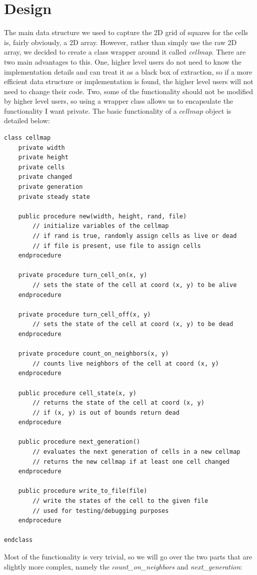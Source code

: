 \documentclass[12pt]{report}
\begin{document}
\chapter{Design}
The main data structure we used to capture the 2D grid of squares for the cells is, fairly obviously, a 2D array.
However, rather than simply use the raw 2D array, we decided to create a class wrapper around it called \emph{cellmap}.
There are two main advantages to this. One, higher level users do not need to know the implementation details and can treat
it as a black box of extraction, so if a more efficient data structure or implementation is found, 
the higher level users will not need to change their code.
Two, some of the functionality should not be modified by higher level users, so using a wrapper class allows us to encapsulate the functionality I want private.
The basic functionality of a $cellmap$ object is detailed below:
\begin{verbatim}
class cellmap
    private width
    private height
    private cells
    private changed
    private generation
    private steady state

    public procedure new(width, height, rand, file)
        // initialize variables of the cellmap 
        // if rand is true, randomly assign cells as live or dead
        // if file is present, use file to assign cells
    endprocedure

    private procedure turn_cell_on(x, y)
        // sets the state of the cell at coord (x, y) to be alive
    endprocedure

    private procedure turn_cell_off(x, y)
        // sets the state of the cell at coord (x, y) to be dead
    endprocedure

    private procedure count_on_neighbors(x, y)
        // counts live neighbors of the cell at coord (x, y)
    endprocedure

    public procedure cell_state(x, y)
        // returns the state of the cell at coord (x, y)
        // if (x, y) is out of bounds return dead
    endprocedure

    public procedure next_generation()
        // evaluates the next generation of cells in a new cellmap
        // returns the new cellmap if at least one cell changed
    endprocedure

    public procedure write_to_file(file)
        // write the states of the cell to the given file
        // used for testing/debugging purposes
    endprocedure

endclass
\end{verbatim}
Most of the functionality is very trivial, so we will go over the two parts that are slightly more complex,
namely the \emph{count\_on\_neighbors} and \emph{next\_generation}:\\
\end{document}

